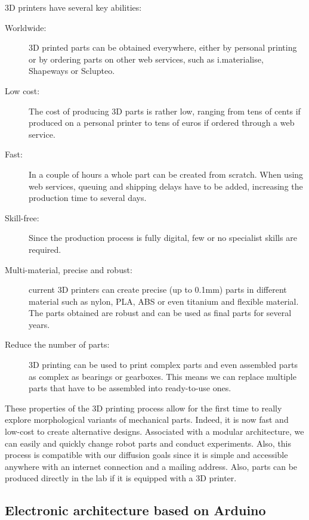3D printers have several key abilities:
\begin{description}
    \item[Worldwide:] 3D printed parts can be obtained everywhere, either by personal printing or by ordering parts on other web services, such as i.materialise, Shapeways or Sclupteo.
    \item[Low cost:] The cost of producing 3D parts is rather low, ranging from tens of cents if produced on a personal printer to tens of euros if ordered through a web service.
    \item[Fast:] In a couple of hours a whole part can be created from scratch. When using web services, queuing and shipping delays have to be added, increasing the production time to several days.
    \item[Skill-free:] Since the production process is fully digital, few or no specialist skills are required.
    \item[Multi-material, precise and robust:] current 3D printers can create precise (up to 0.1mm) parts in different material such as nylon, PLA, ABS or even titanium and flexible material. The parts obtained are robust and can be used as final parts for several years.
    \item[Reduce the number of parts:] 3D printing  can be used to print complex parts and even assembled parts as complex as bearings or gearboxes. This means we can replace multiple parts that have to be assembled into ready-to-use ones.
\end{description}

These properties of the 3D printing process allow for the first time to really explore morphological variants of mechanical parts. Indeed, it is now fast and low-cost to create alternative designs. Associated with a modular architecture, we can easily and quickly change robot parts and conduct experiments. Also, this process is compatible with our diffusion goals since it is simple and accessible anywhere with an internet connection and a mailing address. Also, parts can be produced directly in the lab if it is equipped with a 3D printer.


\subsection{Electronic architecture based on Arduino} %
\label{sec:methodo-arduino}

